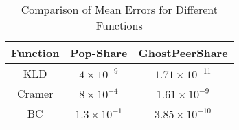 \begin{table}[h!]
\centering
\begin{tabular}{|c|c|c|}
\hline
\textbf{Function} & \textbf{Pop-Share} & \textbf{GhostPeerShare} \\
\hline
KLD     & $4 \times 10^{-9}$ & $1.71 \times 10^{-11}$ \\
Cramer  & $8 \times 10^{-4}$ & $1.61 \times 10^{-9}$ \\
BC      & $1.3 \times 10^{-1}$ & $3.85 \times 10^{-10}$ \\
\hline
\end{tabular}
\caption{Comparison of Mean Errors for Different Functions}
\label{table:mean-error}
\end{table}
